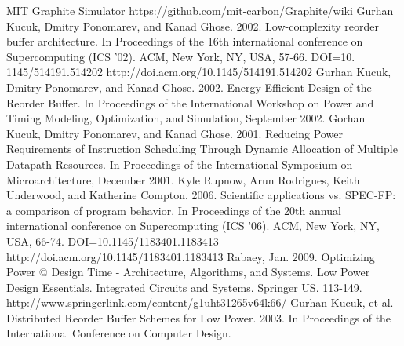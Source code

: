 \documentclass{acm_proc_article-sp}
\begin{document}
\maketitle










\begin{thebibliography}{------}
MIT Graphite Simulator
https://github.com/mit-carbon/Graphite/wiki
Gurhan Kucuk, Dmitry Ponomarev, and Kanad Ghose. 2002. Low-complexity reorder buffer architecture. In Proceedings
of the 16th international conference on Supercomputing (ICS '02). ACM, New York, NY, USA, 57-66. DOI=10.
1145/514191.514202 http://doi.acm.org/10.1145/514191.514202
Gurhan Kucuk, Dmitry Ponomarev, and Kanad Ghose. 2002. Energy-Efficient Design of the Reorder Buffer. In Proceedings of the International Workshop on Power and Timing Modeling, Optimization, and Simulation, September 2002.
Gorhan Kucuk, Dmitry Ponomarev, and Kanad Ghose. 2001. Reducing Power Requirements of Instruction Scheduling Through Dynamic Allocation of Multiple Datapath Resources. In Proceedings of the International Symposium on Microarchitecture, December 2001.
Kyle Rupnow, Arun Rodrigues, Keith Underwood, and Katherine Compton. 2006. Scientific applications vs. SPEC-FP: a comparison of program behavior. In Proceedings of the 20th annual international conference on Supercomputing (ICS '06). ACM, New York, NY, USA, 66-74. DOI=10.1145/1183401.1183413 http://doi.acm.org/10.1145/1183401.1183413 
Rabaey, Jan.  2009.  Optimizing Power @ Design Time - Architecture, Algorithms, and Systems.  Low Power Design Essentials. Integrated Circuits and Systems.  Springer US.  113-149. http://www.springerlink.com/content/g1uht31265v64k66/
Gurhan Kucuk, et al. Distributed Reorder Buffer Schemes for Low Power. 2003. In Proceedings of the International Conference on Computer Design. 

\end{thebibliography}
\end{document}
